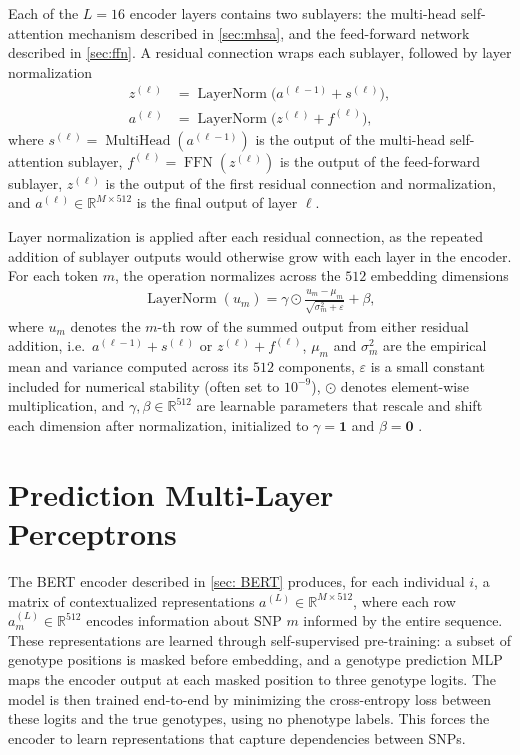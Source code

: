 Each of the $L = 16$ encoder layers contains two sublayers: the multi-head self-attention mechanism described in \autoref{sec:mhsa}, and the feed-forward network described in \autoref{sec:ffn}. A residual connection wraps each sublayer, followed by layer normalization
\begin{align*}
    z^{(\ell)}   &= \operatorname{LayerNorm}\!\bigl(a^{(\ell-1)} + s^{(\ell)}\bigr), \\
    a^{(\ell)}   &= \operatorname{LayerNorm}\!\bigl(z^{(\ell)} + f^{(\ell)}\bigr),
\end{align*}
where $s^{(\ell)} = \operatorname{MultiHead}(a^{(\ell-1)})$ is the output of the multi-head self-attention sublayer, $f^{(\ell)} = \operatorname{FFN}(z^{(\ell)})$ is the output of the feed-forward sublayer, $z^{(\ell)}$ is the output of the first residual connection and normalization, and $a^{(\ell)} \in \mathbb{R}^{M \times 512}$ is the final output of layer $\ell$.

Layer normalization is applied after each residual connection, as the repeated addition of sublayer outputs would otherwise grow with each layer in the encoder. For each token $m$, the operation normalizes across the $512$ embedding dimensions
\begin{align}\label{eq: LayerNorm}
    \operatorname{LayerNorm}(u_m) = \gamma \odot \frac{u_m - \mu_m}{\sqrt{\sigma_m^2 + \varepsilon}} + \beta,
\end{align}
where $u_m$ denotes the $m$-th row of the summed output from either residual addition, i.e.\ $a^{(\ell-1)} + s^{(\ell)}$ or $z^{(\ell)} + f^{(\ell)}$, $\mu_m$ and $\sigma_m^2$ are the empirical mean and variance computed across its $512$ components, $\varepsilon$ is a small constant included for numerical stability (often set to $10^{-9}$), $\odot$ denotes element-wise multiplication, and $\gamma, \beta \in \mathbb{R}^{512}$ are learnable parameters that rescale and shift each dimension after normalization, initialized to $\gamma = \mathbf{1}$ and $\beta = \mathbf{0}$ \citep{LayerNorm}.

\section{Prediction Multi-Layer Perceptrons} \label{sec:prediction_heads}
The BERT encoder described in \autoref{sec: BERT} produces, for each individual $i$, a matrix of contextualized representations $a^{(L)} \in \mathbb{R}^{M \times 512}$, where each row $a^{(L)}_m \in \mathbb{R}^{512}$ encodes information about SNP $m$ informed by the entire sequence. These representations are learned through self-supervised pre-training: a subset of genotype positions is masked before embedding, and a genotype prediction MLP maps the encoder output at each masked position to three genotype logits. The model is then trained end-to-end by minimizing the cross-entropy loss between these logits and the true genotypes, using no phenotype labels. This forces the encoder to learn representations that capture dependencies between SNPs.

